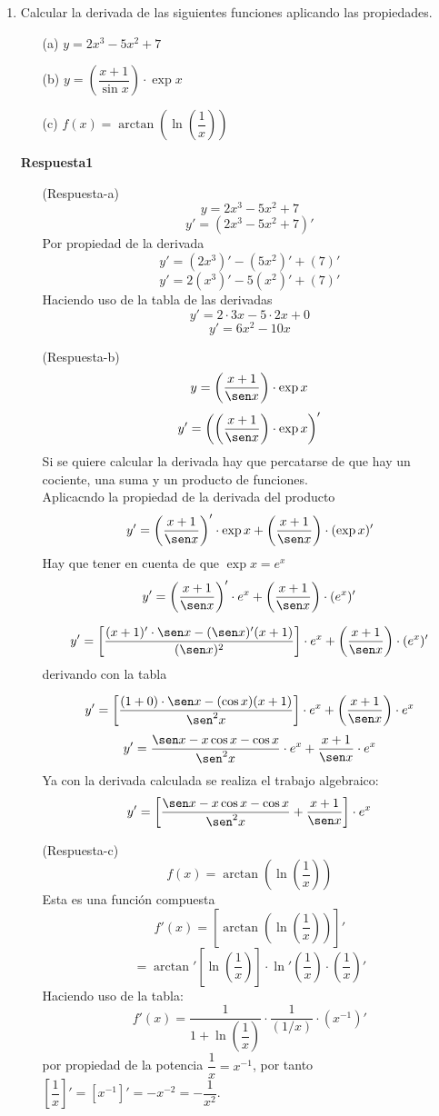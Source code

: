 \documentclass[10pt,twoside]{SelfArx} %
\begin{document}
\begin{enumerate}
	\item Calcular la derivada de las siguientes funciones aplicando las propiedades.
	\begin{enumerate}
		\item[(a)]	$ y=2x^{3}-5x^{2}+7 $
		\item[(b)]	$ y=\left(\dfrac{x+1}{\sin x}\right)\cdot\exp x $
		\item[(c)]	$ f(x)=\arctan\left (\ln\left (\dfrac{1}{x}\right )\right ) $
	\end{enumerate}
	\textbf{Respuesta1}\\
\begin{enumerate}
	\item[(Respuesta-a)]
	\[  y=2x^{3}-5x^{2}+7  \]
	\[ y'=(2x^{3}-5x^{2}+7)' \]
	Por propiedad de la derivada
	\[ y'=(2x^{3})'-(5x^{2})'+(7)' \]
	\[ y'=2(x^{3})'-5(x^{2})'+(7)' \]
	Haciendo uso de la tabla de las derivadas
	\[ y'=2\cdot3x-5\cdot2x+0 \] 
	\[ y'=6x^{2}-10x \]
	
	\item[(Respuesta-b)]
	\[ y=\left(\dfrac{x+1}{\sen x}\right)\cdot\exp x \]
	\[ y'=\left (\left(\dfrac{x+1}{\sen x}\right)\cdot\exp x\right )' \]
	Si se quiere calcular la derivada hay que percatarse de que hay un cociente, una suma y un producto de funciones.\\
	Aplicacndo la propiedad de la derivada del producto
	\[ y'=\left(\dfrac{x+1}{\sen x}\right)'\cdot\exp x+\left(\dfrac{x+1}{\sen x}\right)\cdot(\exp x)' \]
	Hay que tener en cuenta de que $ \exp x=e^{x} $
	\[ y'=\left(\dfrac{x+1}{\sen x}\right)'\cdot e^{x}+\left(\dfrac{x+1}{\sen x}\right)\cdot (e^{x})' \]
	
	\[ y'=\left[\dfrac{(x+1)'\cdot\sen x -(\sen x)'(x+1)}{(\sen x)^{2}}\right]\cdot e^{x}+\left(\dfrac{x+1}{\sen x}\right)\cdot (e^{x})'
\]
	derivando con la tabla
	
	\[ y'=\left[\dfrac{(1+0)\cdot\sen x -(\cos x)(x+1)}{\sen^{2} x}\right]\cdot e^{x}+\left(\dfrac{x+1}{\sen x}\right)\cdot e^{x}
	\]
	\[ y'=\dfrac{\sen x-x\cos x-\cos x}{\sen^{2}x}\cdot e^{x}+\dfrac{x+1}{\sen x}\cdot e^{x} \]
	Ya con la derivada calculada se realiza el trabajo algebraico:\\
	\[ y'=\left [\dfrac{\sen x-x\cos x-\cos x}{\sen^{2}x}+\dfrac{x+1}{\sen x}\right ]\cdot e^{x} \]
	
	
	
	\item[(Respuesta-c)]	
	\[  f(x)=\arctan\left (\ln\left (\dfrac{1}{x}\right )\right )  \]
	Esta es una función compuesta
	\[  f'(x)=\left[\arctan\left (\ln\left (\dfrac{1}{x}\right )\right)\right]' \]
	\[ =\arctan'\left[ \ln\left (\dfrac{1}{x}\right )\right ]\cdot\ln'\left (\dfrac{1}{x}\right )\cdot\left (\dfrac{1}{x}\right )'  \]
	Haciendo uso de la tabla:
	\[ f'(x)=\dfrac{1}{1+\ln \left (\dfrac{1}{x} \right )}\cdot\dfrac{1}{(1/x)}\cdot(x^{-1})' \]
	por propiedad de la potencia $ \dfrac{1}{x}=x^{-1} $, por tanto $ \left [\dfrac{1}{x}\right ]'=\left [x^{-1}\right ]'=-x^{-2}=-\dfrac{1}{x^{2}} $.
	

\end{enumerate}
\end{enumerate}
\end{document}

